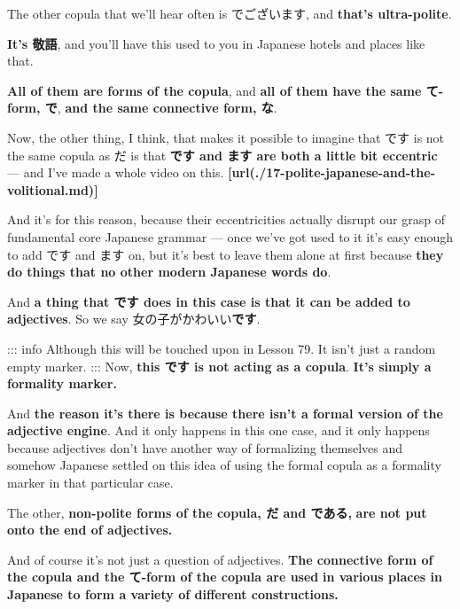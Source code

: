 \startsectionlevel[title={でございます copula form},reference={でございます-copula-form}]

The other copula that we'll hear often is でございます, and {\bf that's ultra-polite}.

{}

{\bf It's 敬語}, and you'll have this used to you in Japanese hotels and places like that.

{\bf All of them are forms of the copula},\crlf
and {\bf all of them have the same て-form, で}, {\bf and the same connective form, な}.

\stopsectionlevel

\startsectionlevel[title={です & ます eccentricity},reference={です-ます-eccentricity}]

Now, the other thing, I think, that makes it possible to imagine that です is not the same copula as だ is that {\bf です and ます are both a little bit eccentric} --- and I've made a whole video on this. {\bf \goto{{[}17{]}}[url(./17-polite-japanese-and-the-volitional.md)]}

And it's for this reason, because their eccentricities actually disrupt our grasp of fundamental core Japanese grammar --- once we've got used to it it's easy enough to add です and ます on, but it's best to leave them alone at first because {\bf they do things that no other modern Japanese words do}.

\thinrule

And {\bf a thing that です does in this case is that it can be added to adjectives}. So we say 女の子がかわいい{\bf です}.

{} ::: info Although this will be touched upon in Lesson 79. It isn't just a random empty marker. ::: Now, {\bf this です is not acting as a copula}. {\bf It's simply a formality marker.}

And {\bf the reason it's there is because there isn't a formal version of the adjective engine}. And it only happens in this one case, and it only happens because adjectives don't have another way of formalizing themselves and somehow Japanese settled on this idea of using the formal copula as a formality marker in that particular case.

The other, {\bf non-polite forms of the copula, だ and である,} {\bf are not put onto the end of adjectives.}

And of course it's not just a question of adjectives. {\bf The connective form of the copula and the て-form of the copula are used} {\bf in various places in Japanese to form a variety of different constructions.}

